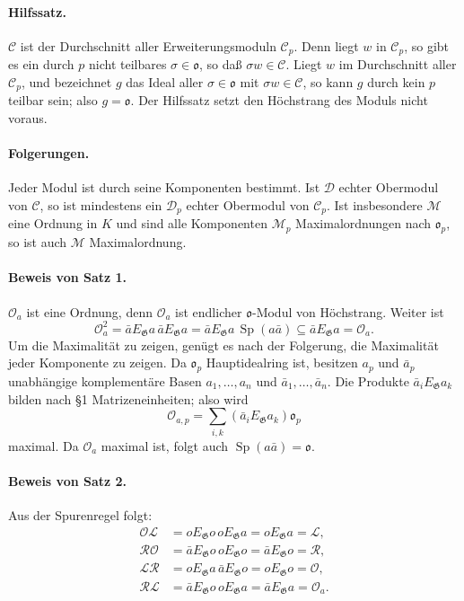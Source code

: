 \documentclass[11pt]{article}
\providecommand{\Sp}{\operatorname{Sp}}
\providecommand{\Gg}{\mathfrak G}
\providecommand{\oo}{\mathfrak o}
\begin{document}
\paragraph{Hilfssatz.}
\(\mathcal C\) ist der Durchschnitt aller Erweiterungsmoduln \(\mathcal C_p\). Denn liegt \(w\) in \(\mathcal C_p\), so gibt es ein durch \(p\) nicht teilbares \(\sigma\in\oo\), so daß \(\sigma w\in\mathcal C\). Liegt \(w\) im Durchschnitt aller \(\mathcal C_p\), und bezeichnet \(g\) das Ideal aller \(\sigma\in\oo\) mit \(\sigma w\in\mathcal C\), so kann \(g\) durch kein \(p\) teilbar sein; also \(g=\oo\). Der Hilfssatz setzt den Höchstrang des Moduls nicht voraus.

\paragraph{Folgerungen.}
Jeder Modul ist durch seine Komponenten bestimmt. Ist \(\mathcal D\) echter Obermodul von \(\mathcal C\), so ist mindestens ein \(\mathcal D_p\) echter Obermodul von \(\mathcal C_p\). Ist insbesondere \(\mathcal M\) eine Ordnung in \(K\) und sind alle Komponenten \(\mathcal M_p\) Maximalordnungen nach \(\oo_p\), so ist auch \(\mathcal M\) Maximalordnung.

\paragraph{Beweis von Satz 1.}
\(\mathcal O_a\) ist eine Ordnung, denn \(\mathcal O_a\) ist endlicher \(\oo\)-Modul von Höchstrang. Weiter ist
\[
        \mathcal O_a^2
        =\bar aE_\Gg a\,\bar aE_\Gg a
        =\bar aE_\Gg a\,\Sp(a\bar a)
        \subseteq \bar aE_\Gg a=\mathcal O_a.
\]
Um die Maximalität zu zeigen, genügt es nach der Folgerung, die Maximalität jeder Komponente zu zeigen. Da \(\oo_p\) Hauptidealring ist, besitzen \(a_p\) und \(\bar a_p\) unabhängige komplementäre Basen \(a_1,\ldots,a_n\) und \(\bar a_1,\ldots,\bar a_n\). Die Produkte \(\bar a_iE_\Gg a_k\) bilden nach §1 Matrizeneinheiten; also wird
\[
        \mathcal O_{a,p}=\sum_{i,k}(\bar a_iE_\Gg a_k)\oo_p
\]
maximal. Da \(\mathcal O_a\) maximal ist, folgt auch \(\Sp(a\bar a)=\oo\).

\paragraph{Beweis von Satz 2.}
Aus der Spurenregel folgt:
\[
\begin{aligned}
 \mathcal O\mathcal L&=oE_\Gg o\,oE_\Gg a=oE_\Gg a=\mathcal L,\\
 \mathcal R\mathcal O&=\bar aE_\Gg o\,oE_\Gg o=\bar aE_\Gg o=\mathcal R,\\
 \mathcal L\mathcal R&=oE_\Gg a\,\bar aE_\Gg o=oE_\Gg o=\mathcal O,\\
 \mathcal R\mathcal L&=\bar aE_\Gg o\,oE_\Gg a=\bar aE_\Gg a=\mathcal O_a.
\end{aligned}
\]
\end{document}
